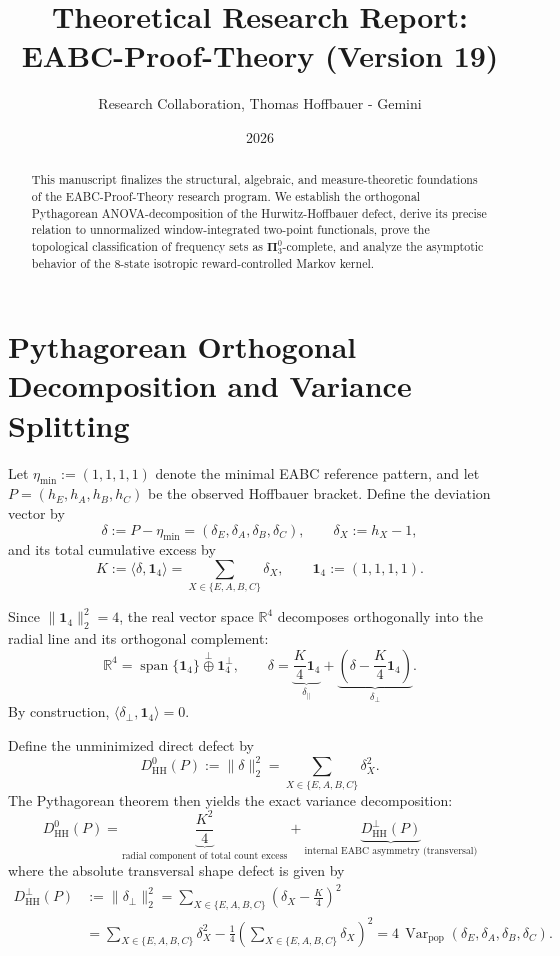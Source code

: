 \documentclass[11pt,a4paper]{article}
\title{Theoretical Research Report: EABC-Proof-Theory (Version 19)}
\author{Research Collaboration, Thomas Hoffbauer  -  Gemini}
\date{2026}
\DeclareMathOperator{\Var}{Var}
\begin{document}
\maketitle

\begin{abstract}
This manuscript finalizes the structural, algebraic, and measure-theoretic foundations of the EABC-Proof-Theory research program. We establish the orthogonal Pythagorean ANOVA-decomposition of the Hurwitz-Hoffbauer defect, derive its precise relation to unnormalized window-integrated two-point functionals, prove the topological classification of frequency sets as \(\mathbf{\Pi}^0_3\)-complete, and analyze the asymptotic behavior of the 8-state isotropic reward-controlled Markov kernel.
\end{abstract}

\section{Pythagorean Orthogonal Decomposition and Variance Splitting}

Let \(\eta_{\min} := (1,1,1,1)\) denote the minimal EABC reference pattern, and let \(P=(h_E,h_A,h_B,h_C)\) be the observed Hoffbauer bracket. Define the deviation vector by
\[
\delta := P - \eta_{\min} = (\delta_E,\delta_A,\delta_B,\delta_C), 
\qquad 
\delta_X := h_X - 1,
\]
and its total cumulative excess by
\[
K := \langle\delta,\mathbf 1_4\rangle = \sum_{X\in\{E,A,B,C\}}\delta_X, 
\qquad 
\mathbf 1_4 := (1,1,1,1).
\]

Since \(\|\mathbf 1_4\|_2^2 = 4\), the real vector space \(\mathbb R^4\) decomposes orthogonally into the radial line and its orthogonal complement:
\[
\mathbb R^4 = \operatorname{span}\{\mathbf 1_4\} \mathbin{\overset{\perp}{\oplus}} \mathbf 1_4^\perp,
\qquad
\delta = \underbrace{\frac K4\mathbf 1_4}_{\delta_\parallel} + \underbrace{\left(\delta-\frac K4\mathbf 1_4\right)}_{\delta_\perp}.
\]
By construction, \(\langle\delta_\perp,\mathbf 1_4\rangle = 0\).

Define the unminimized direct defect by
\[
D_{\mathrm{HH}}^0(P) := \|\delta\|_2^2 = \sum_{X\in\{E,A,B,C\}}\delta_X^2.
\]
The Pythagorean theorem then yields the exact variance decomposition:
\[
\boxed{
D_{\mathrm{HH}}^0(P)
=
\underbrace{\frac{K^2}{4}}_
{\text{radial component of total count excess}}
+
\underbrace{D_{\mathrm{HH}}^\perp(P)}_
{\text{internal EABC asymmetry (transversal)}}
}
\]
where the absolute transversal shape defect is given by
\[
\begin{aligned}
D_{\mathrm{HH}}^\perp(P) 
&:= \|\delta_\perp\|_2^2 
= \sum_{X\in\{E,A,B,C\}} \left(\delta_X-\frac K4\right)^2 \\
&= \sum_{X\in\{E,A,B,C\}}\delta_X^2 - \frac14 \left(\sum_{X\in\{E,A,B,C\}}\delta_X\right)^2 
= 4\,\Var_{\mathrm{pop}}(\delta_E,\delta_A,\delta_B,\delta_C).
\end{aligned}
\]
\end{document}
